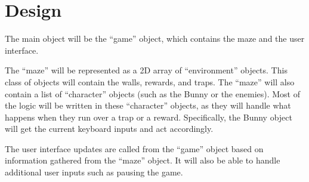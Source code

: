 \documentclass{article}
\begin{document}
\section{Design}

The main object will be the ``game'' object, which contains the maze and the
user interface.

The ``maze'' will be represented as a 2D array of ``environment'' objects.
This class of objects will contain the walls, rewards, and traps.
The ``maze'' will also contain a list of ``character'' objects (such as the
Bunny or the enemies).
Most of the logic will be written in these ``character'' objects, as they will
handle what happens when they run over a trap or a reward.
Specifically, the Bunny object will get the current keyboard inputs and act
accordingly.

The user interface updates are called from the ``game'' object based on
information gathered from the ``maze'' object.
It will also be able to handle additional user inputs such as pausing the game.
\end{document}
